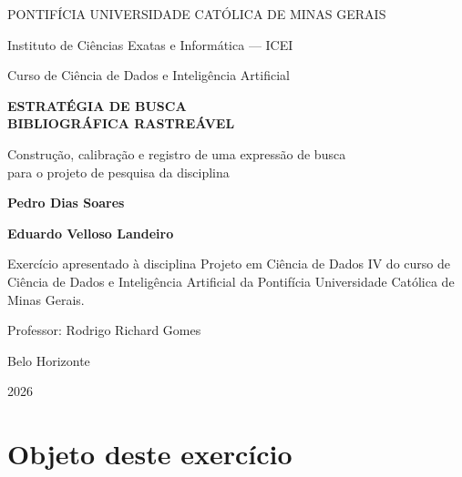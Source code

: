 \documentclass[12pt,a4paper]{article}
\begin{document}
\begin{titlepage}
\centering
\vspace*{0.5cm}

{\large PONTIFÍCIA UNIVERSIDADE CATÓLICA DE MINAS GERAIS\par}
{\normalsize Instituto de Ciências Exatas e Informática --- ICEI\par}
{\normalsize Curso de Ciência de Dados e Inteligência Artificial\par}

\vspace{3.5cm}

{\Large\bfseries ESTRATÉGIA DE BUSCA\\BIBLIOGRÁFICA RASTREÁVEL\par}
\vspace{0.6cm}
{\large Construção, calibração e registro de uma expressão de busca\\
para o projeto de pesquisa da disciplina\par}

\vspace{3.5cm}

{\large\bfseries Pedro Dias Soares\par}
\vspace{0.3em}
{\large\bfseries Eduardo Velloso Landeiro\par}

\vspace{3.5cm}

\begin{flushright}
\begin{minipage}{0.52\textwidth}
\RaggedRight\normalsize
Exercício apresentado à disciplina Projeto em Ciência de Dados IV do curso de
Ciência de Dados e Inteligência Artificial da Pontifícia Universidade Católica
de Minas Gerais.

\vspace{0.8em}
Professor: Rodrigo Richard Gomes
\end{minipage}
\end{flushright}

\vfill
{\normalsize Belo Horizonte\par}
{\normalsize 2026\par}
\end{titlepage}

\tableofcontents
\newpage

\section{Objeto deste exercício}
\end{document}

